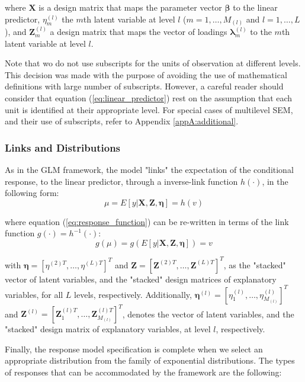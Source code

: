 \noindent where $\mathbf{X}$ is a design matrix that maps the parameter vector $\pmb{\beta}$ to the linear predictor, $\eta_{m}^{(l)}$ the $m$th latent variable at level $l$ ($m=1, \dots, M_{(l)}$ and $l=1, \dots, L$), and $\mathbf{Z}_{m}^{(l)}$ a design matrix that maps the vector of loadings $\pmb{\lambda}_{m}^{(l)}$ to the $m$th latent variable at level $l$.

Note that wo do not use subscripts for the units of observation at different levels. This decision was made with the purpose of avoiding the use of mathematical definitions with large number of subscripts. However, a careful reader should consider that equation (\ref{eq:linear_predictor}) rest on the assumption that each unit is identified at their appropriate level. For special cases of multilevel SEM, and their use of subscripts, refer to Appendix \ref{appA:additional}.

\subsubsection{Links and Distributions} \label{ss_sect:link_dist}
As in the GLM framework, the model "links" the expectation of the conditional response, to the linear predictor, through a inverse-link function $h(\cdot)$, in the following form: 
\begin{equation} \label{eq:response_function}
	\mu = E[y | \mathbf{X}, \mathbf{Z}, \pmb{\eta}] = h(v)
\end{equation}

\noindent where equation (\ref{eq:response_function}) can be re-written in terms of the link function $g(\cdot) = h^{-1}(\cdot)$:
\begin{equation} \label{eq:link_function}
	g(\mu) = g(E[y | \mathbf{X}, \mathbf{Z}, \pmb{\eta}]) = v
\end{equation}

\noindent with $\pmb{\eta}=\left[\eta^{(2)T}, \dots, \eta^{(L)T}\right]^{T}$ and $\mathbf{Z}=\left[\mathbf{Z}^{(2)T}, \dots, \mathbf{Z}^{(L)T}\right]^{T}$, as the "stacked" vector of latent variables, and the "stacked" design matrices of explanatory variables, for all $L$ levels, respectively. Additionally, $\pmb{\eta}^{(l)}=\left[\eta_{1}^{(l)}, \dots, \eta_{M_{(l)}}^{(l)}\right]^{T}$ and $\mathbf{Z}^{(l)}=\left[\mathbf{Z}_{1}^{(l)T}, \dots, \mathbf{Z}_{M_{(l)}}^{(l)T}\right]^{T}$, denotes the vector of latent variables, and the "stacked" design matrix of explanatory variables, at level $l$, respectively.

Finally, the response model specification is complete when we select an appropriate distribution from the family of exponential distributions. The types of responses that can be accommodated by the framework are the following:

